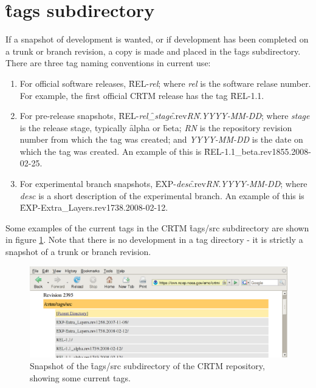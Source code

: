 \section{\f{tags} subdirectory}
If a snapshot of development is wanted, or if development has been completed on a trunk or branch revision, a copy is made and placed in the \f{tags} subdirectory. There are three tag naming conventions in current use:
\begin{enumerate}
  \item For official software releases, \f{REL-}\textit{rel}; where \textit{rel} is the software relase number. For example, the first official CRTM release has the tag \f{REL-1.1}.
  \item For pre-release snapshots, \f{REL-}\textit{rel}\f{\_}\textit{stage}\f{.rev}\textit{RN}\f{.}\textit{YYYY-MM-DD}; where \textit{stage} is the release stage, typically \f{alpha} or \f{beta}; \textit{RN} is the repository revision number from which the tag was created; and \textit{YYYY-MM-DD} is the date on which the tag was created. An example of this is \f{REL-1.1\_beta.rev1855.2008-02-25}.
  \item For experimental branch snapshots, \f{EXP-}\textit{desc}\f{.rev}\textit{RN}\f{.}\textit{YYYY-MM-DD}; where \textit{desc} is a short description of the experimental branch. An example of this is \f{EXP-Extra\_Layers.rev1738.2008-02-12}.
\end{enumerate}
Some examples of the current tags in the CRTM \f{tags/src} subdirectory are shown in figure \ref{fig:tags_src_repository}. Note that there is no development in a tag directory - it is strictly a snapshot of a trunk or branch revision.

\begin{figure}[htb]
  \centering
  \includegraphics[scale=0.5]{graphics/tags_src_repository.eps}
  \caption{Snapshot of the \f{tags/src} subdirectory of the CRTM repository, showing some current tags.}
  \label{fig:tags_src_repository}
\end{figure}


